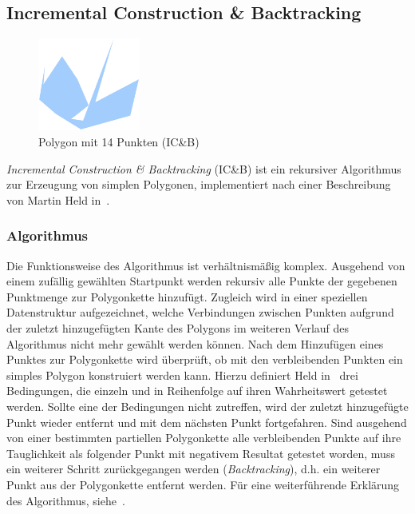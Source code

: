 \subsection{Incremental Construction \& Backtracking}

  \begin{figure}[h]
    \begin{center}
      \includegraphics[width=0.3\textwidth]{img/icb14.eps}
    \end{center}
    \caption{Polygon mit 14 Punkten (IC\&B)}
    \label{fig:icb14}
  \end{figure}

  \emph{Incremental Construction \& Backtracking} (IC\&B) ist ein rekursiver
  Algorithmus zur Erzeugung von simplen Polygonen, implementiert nach einer
  Beschreibung von Martin Held in~\cite{held98polygons}.

  \subsubsection{Algorithmus}

    Die Funktionsweise des Algorithmus ist verhältnismäßig komplex. Ausgehend
    von einem zufällig gewählten Startpunkt werden rekursiv alle Punkte der
    gegebenen Punktmenge zur Polygonkette hinzufügt. Zugleich wird in einer
    speziellen Datenstruktur aufgezeichnet, welche Verbindungen zwischen
    Punkten aufgrund der zuletzt hinzugefügten Kante des Polygons im weiteren
    Verlauf des Algorithmus nicht mehr gewählt werden können. Nach dem
    Hinzufügen eines Punktes zur Polygonkette wird überprüft, ob mit den
    verbleibenden Punkten ein simples Polygon konstruiert werden kann. Hierzu
    definiert Held in~\cite{held98polygons} drei Bedingungen, die einzeln und
    in Reihenfolge auf ihren Wahrheitswert getestet werden. Sollte eine der
    Bedingungen nicht zutreffen, wird der zuletzt hinzugefügte Punkt wieder
    entfernt und mit dem nächsten Punkt fortgefahren. Sind ausgehend von einer
    bestimmten partiellen Polygonkette alle verbleibenden Punkte auf ihre
    Tauglichkeit als folgender Punkt mit negativem Resultat getestet worden,
    muss ein weiterer Schritt zurückgegangen werden (\emph{Backtracking}),
    d.h. ein weiterer Punkt aus der Polygonkette entfernt werden. Für eine
    weiterführende Erklärung des Algorithmus, siehe~\cite{held98polygons}.


